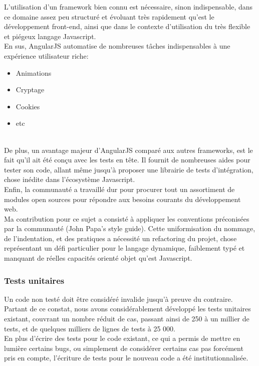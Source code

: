 \documentclass[a4paper,french,12pt]{article}
\begin{document}
	L'utilisation d'un framework bien connu est nécessaire, sinon indispensable, dans ce domaine assez peu structuré et évoluant très rapidement qu'est le développement front-end, ainsi que dans le contexte d'utilisation du très flexible et piégeux langage Javascript.~\\	
	
	En sus, AngularJS automatise de nombreuses tâches indispensables à une expérience utilisateur riche:~\\	
	
	\begin{itemize}
		\item Animations
		\item Cryptage
		\item Cookies
		\item etc
	\end{itemize}~\\	
	
	De plus, un avantage majeur d'AngularJS comparé aux autres frameworks, est le fait qu'il ait été conçu avec les tests en tête. Il fournit de nombreuses aides pour tester son code, allant même jusqu'à proposer une librairie de tests d'intégration, chose inédite dans l'écosystème Javascript.~\\	
	
	Enfin, la communauté a travaillé dur pour procurer tout un assortiment de modules open sources pour répondre aux besoins courants du développement web.~\\	
	
	Ma contribution pour ce sujet a consisté à appliquer les conventions préconisées par la communauté (John Papa's style guide). Cette uniformisation du nommage, de l'indentation, et des pratiques a nécessité un refactoring du projet, chose représentant un défi particulier pour le langage dynamique, faiblement typé et manquant de réelles capacités orienté objet qu'est Javascript.
	
		\subsubsection{Tests unitaires}
			Un code non testé doit être considéré invalide jusqu'à preuve du contraire. Partant de ce constat, nous avons considérablement développé les tests unitaires existant, couvrant un nombre réduit de cas, passant ainsi de 250 à un millier de tests, et de quelques milliers de lignes de tests à 25 000. ~\\	
			
	En plus d'écrire des tests pour le code existant, ce qui a permis de mettre en lumière certains bugs, ou simplement de considérer certains cas pas forcément pris en compte, l'écriture de tests pour le nouveau code a été institutionnalisée. ~\\	
	
\end{document}
